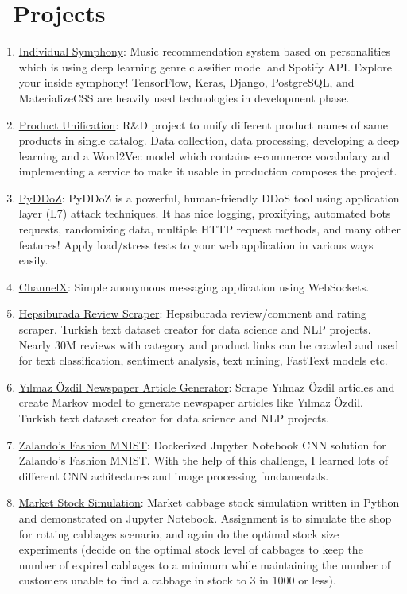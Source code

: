 \documentclass{resume}
\begin{document}
\section{\faInfo\ Projects}
\begin{enumerate}[parsep=0.5ex]
    \item \href{https://individualsymphony.com}{Individual Symphony}: Music recommendation system based on personalities which is using deep learning genre classifier model and Spotify API. Explore your inside symphony! TensorFlow, Keras, Django, PostgreSQL, and MaterializeCSS are heavily used technologies in development phase.
    \item \href{#!}{Product Unification}: R\&D project to unify different product names of same products in single catalog. Data collection, data processing, developing a deep learning and a Word2Vec model which contains e-commerce vocabulary and implementing a service to make it usable in production composes the project.
    \item \href{https://github.com/0x01h/pyddoz}{PyDDoZ}: PyDDoZ is a powerful, human-friendly DDoS tool using application layer (L7) attack techniques. It has nice logging, proxifying, automated bots requests, randomizing data, multiple HTTP request methods, and many other features! Apply load/stress tests to your web application in various ways easily.
    \item \href{https://github.com/0x01h/channelx}{ChannelX}: Simple anonymous messaging application using WebSockets.
    \item \href{https://github.com/0x01h/hepsiburada-review-scraper}{Hepsiburada Review Scraper}: Hepsiburada review/comment and rating scraper. Turkish text dataset creator for data science and NLP projects. Nearly 30M reviews with category and product links can be crawled and used for text classification, sentiment analysis, text mining, FastText models etc.
    \item \href{https://github.com/0x01h/yozdil-article-scraper-generator}{Yılmaz Özdil Newspaper Article Generator}: Scrape Yılmaz Özdil articles and create Markov model to generate newspaper articles like Yılmaz Özdil. Turkish text dataset creator for data science and NLP projects.
    \item \href{https://github.com/0x01h/zalando-fashion-mnist}{Zalando's Fashion MNIST}: Dockerized Jupyter Notebook CNN solution for Zalando's Fashion MNIST. With the help of this challenge, I learned lots of different CNN achitectures and image processing fundamentals.
    \item \href{https://github.com/0x01h/market-cabbage-stock-simulation}{Market Stock Simulation}: Market cabbage stock simulation written in Python and demonstrated on Jupyter Notebook. Assignment is to simulate the shop for rotting cabbages scenario, and again do the optimal stock size experiments (decide on the optimal stock level of cabbages to keep the number of expired cabbages to a minimum while maintaining the number of customers unable to find a cabbage in stock to 3 in 1000 or less).

\end{enumerate}
\end{document}

